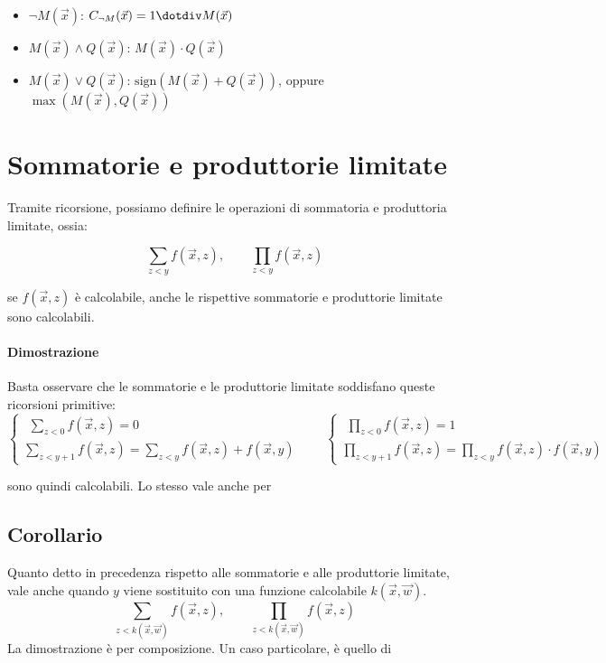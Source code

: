 	\begin{itemize}
		\item $\lnot M(\vec{x})$: $C_{\lnot M}(\vec{x}) = 1 \dotdiv M(\vec{x})$
		\item $M(\vec{x}) \land Q(\vec{x})$: $M(\vec{x}) \cdot Q(\vec{x})$
		\item $M(\vec{x}) \lor Q(\vec{x})$: $\mathrm{sign}(M(\vec{x}) + Q(\vec{x}))$, oppure $\max(M(\vec{x}), Q(\vec{x}))$
	\end{itemize}
	
	
	
	\newpage
	
	\section{Sommatorie e produttorie limitate}
	Tramite ricorsione, possiamo definire le operazioni di sommatoria e produttoria limitate, ossia:
	
	$$
	\sum_{z < y}f(\vec{x},z), \qquad \prod_{z < y}f(\vec{x},z)
	$$
	
	se $f(\vec{x},z)$ è calcolabile, anche le rispettive sommatorie e produttorie limitate sono calcolabili.
	
	\paragraph{Dimostrazione}
	Basta osservare che le sommatorie e le produttorie limitate soddisfano queste ricorsioni primitive:
	$$
	\begin{cases}
		\ \, \displaystyle\sum_{z<0}	f(\vec{x},z) = 0\\
		\displaystyle\sum_{z<y+1}f(\vec{x},z) = \sum_{z<y}f(\vec{x},z) + f(\vec{x}, y)
	\end{cases}
	\qquad
	\begin{cases}
		\ \,\displaystyle\prod_{z<0}	f(\vec{x},z) = 1\\
		\displaystyle\prod_{z<y+1}f(\vec{x},z) = \prod_{z<y}f(\vec{x},z) \cdot f(\vec{x}, y)
	\end{cases}
	$$
	
	sono quindi calcolabili. Lo stesso vale anche per
	
	\subsection{Corollario}
	Quanto detto in precedenza rispetto alle sommatorie e alle produttorie limitate, vale anche quando $y$ viene sostituito con una funzione calcolabile $k(\vec{x}, \vec{w})$. 
	$$
	\sum_{z < k(\vec{x}, \vec{w})}f(\vec{x},z), \qquad \prod_{z < k(\vec{x}, \vec{w})}f(\vec{x},z)
	$$
	La dimostrazione è per composizione. Un caso particolare, è quello di
	
